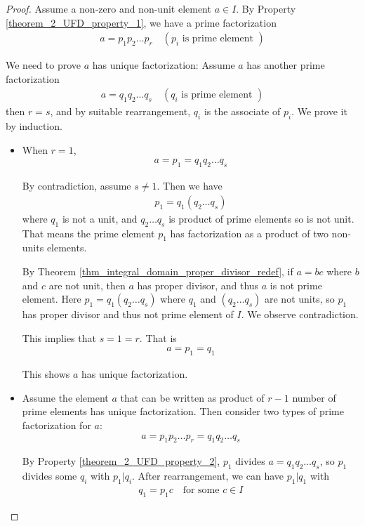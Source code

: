 \documentclass[utf8]{ctexbook}
\theoremstyle{definition}
\begin{document}
\begin{proof}
Assume a non-zero and non-unit element $a \in I$. By Property \ref{theorem_2_UFD_property_1}, we have a prime factorization
\begin{align*}
a = p_1 p_2 \ldots p_r \quad (p_i \mbox{ is prime element })
\end{align*}

We need to prove $a$ has unique factorization: Assume $a$ has another prime factorization
\begin{align*}
a = q_1 q_2 \ldots q_s \quad (q_i \mbox{ is prime element })
\end{align*} 
then $r= s $, and by suitable rearrangement, $q_i$ is the associate of $p_i$. We prove it by induction.
\begin{itemize}
\item{When $r=1$,
\begin{align*}
a = p_1 = q_1 q_2 \ldots q_s
\end{align*}

By contradiction, assume $s \neq 1$. Then we have
\begin{align*}
p_1 = q_1 (q_2 \ldots q_s)
\end{align*}
where $q_1$ is not a unit, and $q_2 \ldots q_s$ is product of prime elements so is not unit. That means the prime element $p_1$ has factorization as a product of two non-units elements.

By Theorem 
\ref{thm_integral_domain_proper_divisor_redef}, if $a = bc$ where $b$ and $c$ are not unit, then $a$ has proper divisor, and thus $a$ is not prime element. Here $p_1 = q_1 (q_2 \ldots q_s)$ where $q_1$ and $(q_2 \ldots q_s)$ are not units, so $p_1$ has proper divisor and thus not prime element of $I$. We observe contradiction. 

This implies that $s=1 = r$. That is
\begin{align*}
a = p_1 = q_1
\end{align*}

This shows $a$ has unique factorization.
}
\item{Assume the element $a$ that can be written as product of $ r - 1 $ number of prime elements has unique factorization. Then consider two types of prime factorization for $a$:
\begin{align*}
a = p_1 p_2 \ldots p_r = q_1 q_2 \ldots q_s
\end{align*}   

By Property \ref{theorem_2_UFD_property_2}, $p_1$ divides $a = q_1 q_2 \ldots q_s$, so $p_1$ divides some $q_i$ with $p_1 | q_i$. After rearrangement, we can have $p_1 | q_1$ with
\begin{align*}
q_1 = p_1 c \quad \mbox{for some } c \in I
\end{align*}

}
\end{itemize}
\end{proof}
\end{document}
